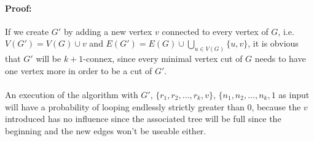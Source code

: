 \paragraph{Proof:}
If we create $G'$ by adding a new vertex $v$ connected to every vertex of $G$,
i.e. $V(G') = V(G) \cup v$ and
$E(G') = E(G) \cup \bigcup \limits_{u \in V(G)} \{u,v\}$, it is obvious that
$G'$ will be $k+1$-connex, since every minimal vertex cut of $G$ needs to have
 one vertex more in order to be a cut of $G'$.

\paragraph{}
An execution of the algorithm with $G'$, $\{r_1,r_2, \dots, r_k, v\}$,
$\{n_1,n_2, \dots, n_k, 1$ as input will have a probability of looping
endlessly strictly greater than $0$, because the $v$ introduced has no influence
since the associated tree will be full since the beginning and the new edges
won't be useable either.
